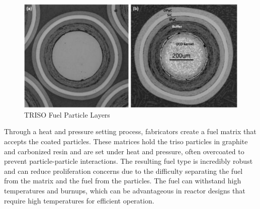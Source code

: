 \begin{figure}[!h]
    \centering
    \includegraphics[scale=0.98]{images/triso_review/triso_layers.pdf}
    \caption{TRISO Fuel Particle Layers \cite{particle_review_2019}}
    \label{fig:triso_layers}
\end{figure}

Through a heat and pressure setting process, fabricators create a fuel matrix
that accepts the coated particles. These matrices hold the \gls{triso}
particles in graphite and carbonized resin and are set under heat and pressure,
often overcoated to prevent particle-particle interactions. The resulting fuel
type is incredibly robust and can reduce proliferation concerns due to the
difficulty separating the fuel from the matrix and the fuel from the particles.
The fuel can withstand high temperatures and burnups, which can be advantageous
in reactor designs that require high temperatures for efficient operation.